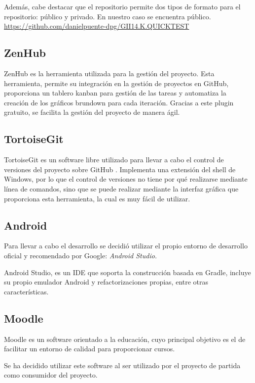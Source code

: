 Además, cabe destacar que el repositorio permite dos tipos de formato para el repositorio: público y privado. En nuestro caso se encuentra público. \url{https://github.com/danielpuente-dpg/GII14.K.QUICKTEST}

\subsection{ZenHub}\label{zenhub}

ZenHub es la herramienta utilizada para la gestión del proyecto.  Esta herramienta, permite su integración en la gestión de proyectos en GitHub, proporciona un tablero kanban para gestión de las tareas y automatiza la creación de los gráficos brundown para cada iteración. Gracias a este plugin gratuito, se facilita la gestión del proyecto de manera ágil. \cite{wiki:zenhub}

\subsection{TortoiseGit}

TortoiseGit es un software libre utilizado para llevar a cabo el control de versiones del proyecto sobre GitHub \cite{wiki:tortoisegit}. Implementa una extensión del shell de Windows, por lo que el control de versiones no tiene por qué realizarse mediante línea de comandos, sino que se puede realizar mediante la interfaz gráfica que proporciona esta herramienta, la cual es muy fácil de utilizar.


\subsection{Android}

Para llevar a cabo el desarrollo se decidió utilizar el propio entorno de desarrollo oficial y recomendado por Google: \emph{Android Studio.}

Android Studio, es un IDE que soporta la construcción basada en Gradle, incluye su propio emulador Android y refactorizaciones propias, entre otras características.

\subsection{Moodle}

Moodle es un software orientado a la educación, cuyo principal objetivo es el de facilitar un entorno de calidad para proporcionar cursos. \cite{wiki:moodle}

Se ha decidido utilizar este software al ser utilizado por el proyecto de partida como consumidor del proyecto.


